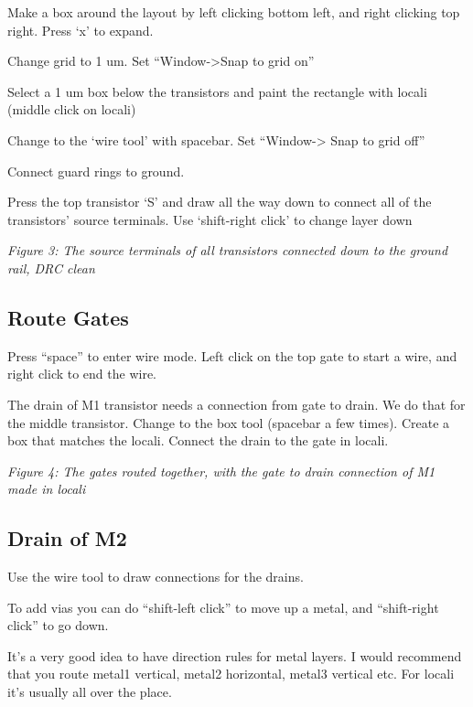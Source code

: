 Make a box around the layout by left clicking bottom left, and right
clicking top right. Press `x' to expand.

Change grid to 1 um. Set ``Window-\textgreater Snap to grid on''

Select a 1 um box below the transistors and paint the rectangle with
locali (middle click on locali)

Change to the `wire tool' with spacebar. Set ``Window-\textgreater{}
Snap to grid off''

Connect guard rings to ground.

Press the top transistor `S' and draw all the way down to connect all of
the transistors' source terminals. Use `shift-right click' to change
layer down


{
\centering
{}
}

\emph{Figure 3: The source terminals of all transistors connected down
to the ground rail, DRC clean}

\subsection{Route Gates}\label{route-gates}

Press ``space'' to enter wire mode. Left click on the top gate to start
a wire, and right click to end the wire.

The drain of M1 transistor needs a connection from gate to drain. We do
that for the middle transistor. Change to the box tool (spacebar a few
times). Create a box that matches the locali. Connect the drain to the
gate in locali.


{
\centering
{}
}

\emph{Figure 4: The gates routed together, with the gate to drain
connection of M1 made in locali}

\subsection{Drain of M2}\label{drain-of-m2}

Use the wire tool to draw connections for the drains.

To add vias you can do ``shift-left click'' to move up a metal, and
``shift-right click'' to go down.

It's a very good idea to have direction rules for metal layers. I would
recommend that you route metal1 vertical, metal2 horizontal, metal3
vertical etc. For locali it's usually all over the place.


